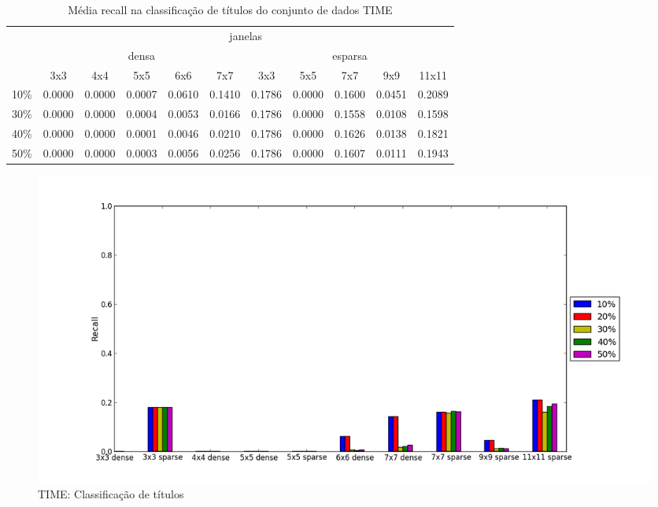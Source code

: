 \documentclass[a4paper,11pt]{article}
\begin{document}
  \begin{center}
    \begin{table}[p]
      \caption{Média recall na classificação de títulos do conjunto de dados TIME}
      \begin{tabular}{ l | c c c c c || c c c c c | }
        \cline{2-11}
        & \multicolumn{10}{|c|}{janelas} \\
        \cline{2-11}
        & \multicolumn{5}{c||}{densa} & \multicolumn{5}{c|}{esparsa} \\
        \cline{2-11}
        & 3x3 & 4x4 & 5x5 & 6x6 & 7x7 & 3x3 & 5x5 & 7x7 & 9x9 & 11x11 \\
        \hline
        \multicolumn{1}{|l|}{10\%}& 0.0000& 0.0000& 0.0007& 0.0610& 0.1410& 0.1786& 0.0000& 0.1600& 0.0451& 0.2089\\
        \multicolumn{1}{|l|}{30\%}& 0.0000& 0.0000& 0.0004& 0.0053& 0.0166& 0.1786& 0.0000& 0.1558& 0.0108& 0.1598\\
        \multicolumn{1}{|l|}{40\%}& 0.0000& 0.0000& 0.0001& 0.0046& 0.0210& 0.1786& 0.0000& 0.1626& 0.0138& 0.1821\\
        \multicolumn{1}{|l|}{50\%}& 0.0000& 0.0000& 0.0003& 0.0056& 0.0256& 0.1786& 0.0000& 0.1607& 0.0111& 0.1943\\
        \hline  
      \end{tabular}
    \end{table}
  \end{center}

  \begin{figure}[p]
    \centerline{\includegraphics[width=1.2\textwidth]{assets/experiment_charts/time_TextRegion_heading_recall_or_sensitivity.png}}
    \caption{TIME: Classificação de títulos}
    \label{fig:time_TextRegion_heading_recall_or_sensitivity}
  \end{figure}
\end{document}
